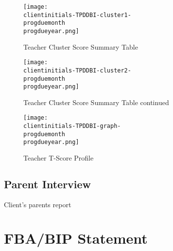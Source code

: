 \documentclass{article}
\def\clientfirstname{Client}
\def\progduemonth{November}
\def\progdueyear{2017}
\def\clientinitials{EY}
\begin{document}
			\begin{figure}
				\begin{center}
				\texttt{[image: \\clientinitials-TPDDBI-cluster1-\\progduemonth\\progdueyear.png]}
				\caption{Teacher Cluster Score Summary Table}
				\label{fig:composite}
				\end{center}
			\end{figure}
			\vfill
			\clearpage

			\newpage
			\vfill
			\begin{figure}
			\begin{center}
				\texttt{[image: \\clientinitials-TPDDBI-cluster2-\\progduemonth\\progdueyear.png]}
				\caption{Teacher Cluster Score Summary Table continued}
			\end{center}
			\end{figure}
			\vfill
			\clearpage

			\newpage
			\vfill
			\begin{figure}
			\begin{center}
				\texttt{[image: \\clientinitials-TPDDBI-graph-\\progduemonth\\progdueyear.png]}
				\caption{Teacher T-Score Profile}
			\end{center}
			\end{figure}
			\vfill
			\clearpage

	\subsection{Parent Interview}
	\clientfirstname's parents report 

\section{FBA/BIP Statement}
\end{document}
